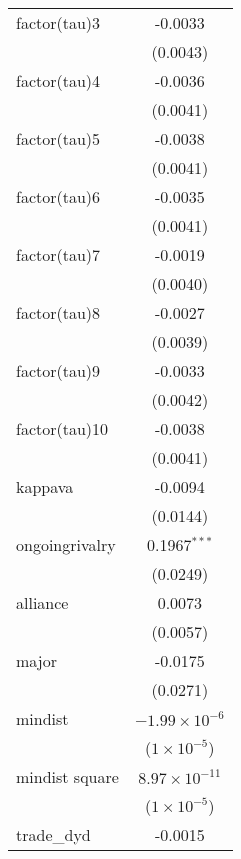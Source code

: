 \begin{tabular}{lc}
   factor(tau)3                    & -0.0033\\   
                                   & (0.0043)\\   
   factor(tau)4                    & -0.0036\\   
                                   & (0.0041)\\   
   factor(tau)5                    & -0.0038\\   
                                   & (0.0041)\\   
   factor(tau)6                    & -0.0035\\   
                                   & (0.0041)\\   
   factor(tau)7                    & -0.0019\\   
                                   & (0.0040)\\   
   factor(tau)8                    & -0.0027\\   
                                   & (0.0039)\\   
   factor(tau)9                    & -0.0033\\   
                                   & (0.0042)\\   
   factor(tau)10                   & -0.0038\\   
                                   & (0.0041)\\   
   kappava                         & -0.0094\\   
                                   & (0.0144)\\   
   ongoingrivalry                  & 0.1967$^{***}$\\   
                                   & (0.0249)\\   
   alliance                        & 0.0073\\   
                                   & (0.0057)\\   
   major                           & -0.0175\\   
                                   & (0.0271)\\   
   mindist                         & $-1.99\times 10^{-6}$\\    
                                   & ($1\times 10^{-5}$)\\    
   mindist square                  & $8.97\times 10^{-11}$\\    
                                   & ($1\times 10^{-5}$)\\    
   trade\_dyd                      & -0.0015\\   

\end{tabular}
